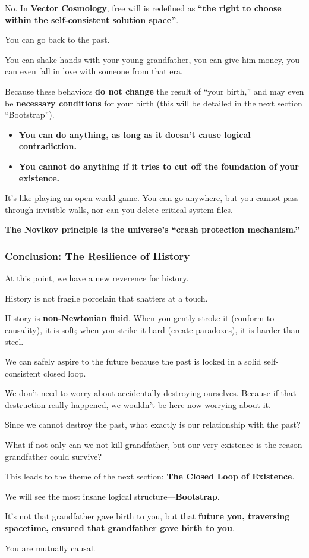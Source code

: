 No. In \textbf{Vector Cosmology}, free will is redefined as \textbf{``the right to choose within the self-consistent solution space''}.

You can go back to the past.

You can shake hands with your young grandfather, you can give him money, you can even fall in love with someone from that era.

Because these behaviors \textbf{do not change} the result of ``your birth,'' and may even be \textbf{necessary conditions} for your birth (this will be detailed in the next section ``Bootstrap'').

\begin{itemize}
\item \textbf{You can do anything, as long as it doesn't cause logical contradiction.}

\item \textbf{You cannot do anything if it tries to cut off the foundation of your existence.}
\end{itemize}

It's like playing an open-world game. You can go anywhere, but you cannot pass through invisible walls, nor can you delete critical system files.

\textbf{The Novikov principle is the universe's ``crash protection mechanism.''}

\subsubsection{Conclusion: The Resilience of History}

At this point, we have a new reverence for history.

History is not fragile porcelain that shatters at a touch.

History is \textbf{non-Newtonian fluid}. When you gently stroke it (conform to causality), it is soft; when you strike it hard (create paradoxes), it is harder than steel.

We can safely aspire to the future because the past is locked in a solid self-consistent closed loop.

We don't need to worry about accidentally destroying ourselves. Because if that destruction really happened, we wouldn't be here now worrying about it.

Since we cannot destroy the past, what exactly is our relationship with the past?

What if not only can we not kill grandfather, but our very existence is the reason grandfather could survive?

This leads to the theme of the next section: \textbf{The Closed Loop of Existence}.

We will see the most insane logical structure---\textbf{Bootstrap}.

It's not that grandfather gave birth to you, but that \textbf{future you, traversing spacetime, ensured that grandfather gave birth to you}.

You are mutually causal.

